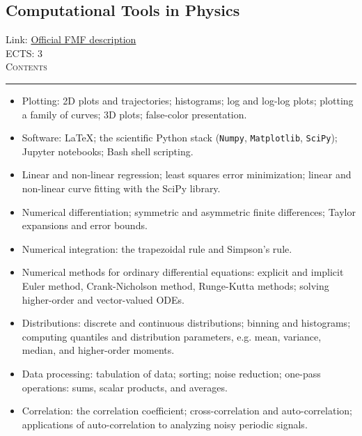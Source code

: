 \documentclass[11pt, a4paper]{article}
\newenvironment{course}[3]{
\subsection{#1}%
Link: \href{#2}{Official FMF description}\\%
ECTS: #3%
\vspace{1ex}
\\
{\large \textsc{Contents}}\\[-0.9ex]%
\rule{\textwidth}{0.5pt}
\vspace{-3ex}
}
{}
\newenvironment{chapter}[1]{
\begin{tcolorbox}[title=#1, breakable]
}
{\end{tcolorbox}}
\begin{document}
\begin{course}{Computational Tools in Physics}{https://www.fmf.uni-lj.si/en/study-physics/programmes/1fiz/2020/7000777/courses/1172/}{3}
    \label{computational_tools_in_physics}

    \begin{chapter}{Material}
        \begin{itemize}
            
            \item Plotting: 2D plots and trajectories; histograms; log and log-log plots; plotting a family of curves; 3D plots; false-color presentation.

            \item Software: \LaTeX; the scientific Python stack (\texttt{Numpy}, \texttt{Matplotlib}, \texttt{SciPy}); Jupyter notebooks; Bash shell scripting.

            \item Linear and non-linear regression; least squares error minimization; linear and non-linear curve fitting with the SciPy library.
        
            \item Numerical differentiation; symmetric and asymmetric finite differences; Taylor expansions and error bounds.

            \item Numerical integration: the trapezoidal rule and Simpson's rule.

            \item Numerical methods for ordinary differential equations: explicit and implicit Euler method, Crank-Nicholson method, Runge-Kutta methods; solving higher-order and vector-valued ODEs.

            \item Distributions: discrete and continuous distributions; binning and histograms; computing quantiles and distribution parameters, e.g. mean, variance, median, and higher-order moments.

            \item Data processing: tabulation of data; sorting; noise reduction; one-pass operations: sums, scalar products, and averages.

            \item Correlation: the correlation coefficient; cross-correlation and auto-correlation; applications of auto-correlation to analyzing noisy periodic signals.

        \end{itemize}
    \end{chapter}

\end{course}
\end{document}
